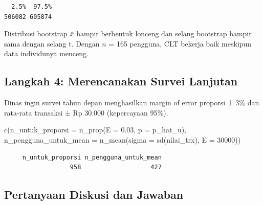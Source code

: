 \documentclass[
  indonesian,
  letterpaper,
]{book}
\newenvironment{Shaded}{\begin{snugshade}}{\end{snugshade}}
\newcommand{\AttributeTok}[1]{\textcolor[rgb]{0.40,0.45,0.13}{#1}}
\newcommand{\DecValTok}[1]{\textcolor[rgb]{0.68,0.00,0.00}{#1}}
\newcommand{\FloatTok}[1]{\textcolor[rgb]{0.68,0.00,0.00}{#1}}
\newcommand{\FunctionTok}[1]{\textcolor[rgb]{0.28,0.35,0.67}{#1}}
\newcommand{\NormalTok}[1]{\textcolor[rgb]{0.00,0.23,0.31}{#1}}
\begin{document}
\begin{verbatim}
  2.5%  97.5% 
506082 605874 
\end{verbatim}

Distribusi bootstrap \(\bar{x}\) hampir berbentuk lonceng dan selang
bootstrap hampir sama dengan selang t. Dengan \(n\) = 165 pengguna, CLT
bekerja baik meskipun data individunya menceng.

\subsection{Langkah 4: Merencanakan Survei
Lanjutan}\label{langkah-4-merencanakan-survei-lanjutan}

Dinas ingin survei tahun depan menghasilkan margin of error proporsi ±
3\% dan rata-rata transaksi ± Rp 30.000 (kepercayaan 95\%).

\begin{Shaded}
\begin{Highlighting}[]
\FunctionTok{c}\NormalTok{(}\AttributeTok{n\_untuk\_proporsi     =} \FunctionTok{n\_prop}\NormalTok{(}\AttributeTok{E =} \FloatTok{0.03}\NormalTok{, }\AttributeTok{p =}\NormalTok{ p\_hat\_u),}
  \AttributeTok{n\_pengguna\_untuk\_mean =} \FunctionTok{n\_mean}\NormalTok{(}\AttributeTok{sigma =} \FunctionTok{sd}\NormalTok{(nilai\_trx), }\AttributeTok{E =} \DecValTok{30000}\NormalTok{))}
\end{Highlighting}
\end{Shaded}

\begin{verbatim}
     n_untuk_proporsi n_pengguna_untuk_mean 
                  958                   427 
\end{verbatim}

\subsection{Pertanyaan Diskusi dan
Jawaban}\label{pertanyaan-diskusi-dan-jawaban}
\end{document}

